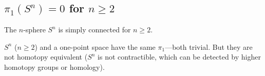 \documentclass[11pt]{report}
\begin{document}
\subsection{\texorpdfstring{$\pi_1(S^n) = 0$}{π₁(Sⁿ) = 0} for \texorpdfstring{$n \geq 2$}{n ≥ 2}}

\begin{thmbox}
The $n$-sphere $S^n$ is simply connected for $n \geq 2$.
\end{thmbox}

\begin{rembox}
$S^n$ ($n \geq 2$) and a one-point space have the same $\pi_1$---both trivial. But they are not homotopy equivalent ($S^n$ is not contractible, which can be detected by higher homotopy groups or homology).
\end{rembox}
\end{document}
